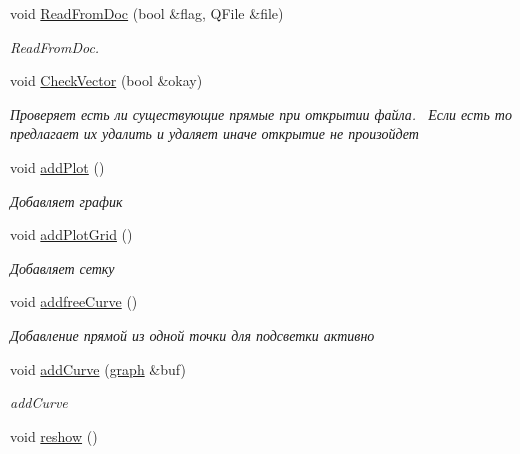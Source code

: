 \begin{DoxyCompactItemize}
void \hyperlink{class_main_window_a219bfb3f9f9946118aaebb0e88f64315}{Read\+From\+Doc} (bool \&flag, Q\+File \&file)
\begin{DoxyCompactList}\small\item\em Read\+From\+Doc. \end{DoxyCompactList}\item 
void \hyperlink{class_main_window_a236bdec985319b80062b14e4e53bf2a0}{Check\+Vector} (bool \&okay)\hypertarget{class_main_window_a236bdec985319b80062b14e4e53bf2a0}{}\label{class_main_window_a236bdec985319b80062b14e4e53bf2a0}

\begin{DoxyCompactList}\small\item\em Проверяет есть ли существующие прямые при открытии файла.~\newline
 Если есть то предлагает их удалить и удаляет иначе открытие не произойдет \end{DoxyCompactList}\item 
void \hyperlink{class_main_window_a77cab55db6f0a5b74c9f7d3da47e006f}{add\+Plot} ()\hypertarget{class_main_window_a77cab55db6f0a5b74c9f7d3da47e006f}{}\label{class_main_window_a77cab55db6f0a5b74c9f7d3da47e006f}

\begin{DoxyCompactList}\small\item\em Добавляет график \end{DoxyCompactList}\item 
void \hyperlink{class_main_window_abb03c14d2a968e50a8d069b73f27efb0}{add\+Plot\+Grid} ()\hypertarget{class_main_window_abb03c14d2a968e50a8d069b73f27efb0}{}\label{class_main_window_abb03c14d2a968e50a8d069b73f27efb0}

\begin{DoxyCompactList}\small\item\em Добавляет сетку \end{DoxyCompactList}\item 
void \hyperlink{class_main_window_a3d6f33a054126933c27adefd9ea329e0}{addfree\+Curve} ()\hypertarget{class_main_window_a3d6f33a054126933c27adefd9ea329e0}{}\label{class_main_window_a3d6f33a054126933c27adefd9ea329e0}

\begin{DoxyCompactList}\small\item\em Добавление прямой из одной точки для подсветки активно \end{DoxyCompactList}\item 
void \hyperlink{class_main_window_aa5c0998b1192bfab3ff83b02c42b2c67}{add\+Curve} (\hyperlink{classgraph}{graph} \&buf)
\begin{DoxyCompactList}\small\item\em add\+Curve \end{DoxyCompactList}\item 
void \hyperlink{class_main_window_a24985964bdf5f59467dcc99749e06bdd}{reshow} ()\hypertarget{class_main_window_a24985964bdf5f59467dcc99749e06bdd}{}\label{class_main_window_a24985964bdf5f59467dcc99749e06bdd}


\end{DoxyCompactItemize}
